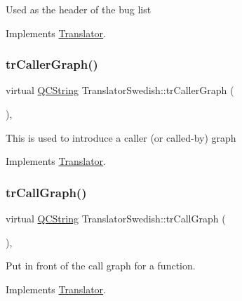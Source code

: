 Used as the header of the bug list 

Implements \mbox{\hyperlink{class_translator}{Translator}}.

\mbox{\label{class_translator_swedish_a3db902b341c18783b62c3e2de108d2ca}} 
\subsubsection{\texorpdfstring{trCallerGraph()}{trCallerGraph()}}
{\footnotesize\ttfamily virtual \mbox{\hyperlink{class_q_c_string}{Q\+C\+String}} Translator\+Swedish\+::tr\+Caller\+Graph (\begin{DoxyParamCaption}{ }\end{DoxyParamCaption})\hspace{0.3cm}{\ttfamily [inline]}, {\ttfamily [virtual]}}

This is used to introduce a caller (or called-\/by) graph 

Implements \mbox{\hyperlink{class_translator}{Translator}}.

\mbox{\label{class_translator_swedish_a45b7e6e53451b6db5f72706bd7e24cd4}} 
\subsubsection{\texorpdfstring{trCallGraph()}{trCallGraph()}}
{\footnotesize\ttfamily virtual \mbox{\hyperlink{class_q_c_string}{Q\+C\+String}} Translator\+Swedish\+::tr\+Call\+Graph (\begin{DoxyParamCaption}{ }\end{DoxyParamCaption})\hspace{0.3cm}{\ttfamily [inline]}, {\ttfamily [virtual]}}

Put in front of the call graph for a function. 

Implements \mbox{\hyperlink{class_translator}{Translator}}.

\mbox{\label{class_translator_swedish_a5404c6b3457fd504f49238b7c621bea6}} 
